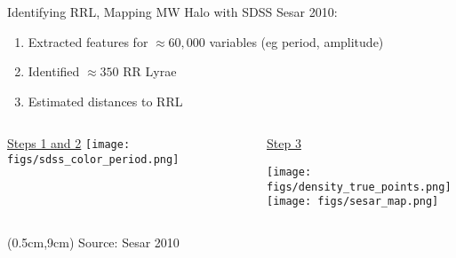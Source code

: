 \documentclass[12pt]{beamer}
\newcommand{\todo}[1]{{\color{red}TODO: #1}}
\newcommand{\att}[1]{\begin{textblock*}{12cm}(0.5cm,9cm) %
  {\tiny Source: #1}
      \end{textblock*}}
\begin{document}
\begin{frame}{Identifying RRL, Mapping MW Halo with SDSS}
  Sesar 2010:
  \begin{enumerate}
  \item Extracted features for $\approx 60,000$ variables (eg period, amplitude)
  \item Identified $\approx 350$ RR Lyrae
  \item Estimated distances to RRL
  \end{enumerate}

  \begin{columns}
    \begin{column}{0.5\textwidth}

      \vspace{-.22in}

      \begin{center}
        \underline{Steps 1 and 2}
        \texttt{[image: figs/sdss\_color\_period.png]}
      \end{center}
      \end{column}
    \begin{column}{0.5\textwidth}

      \vspace{-.55in}

      \begin{center}
      \underline{Step 3}
      \end{center}
      
      \vspace{-.35in}
      \begin{center}
      \texttt{[image: figs/density\_true\_points.png]}\\
      \texttt{[image: figs/sesar\_map.png]}
      \end{center}
    \end{column}
\end{columns}

\att{Sesar 2010 \cite{sesar2010light}}
  
\end{frame}



  
\end{document}
